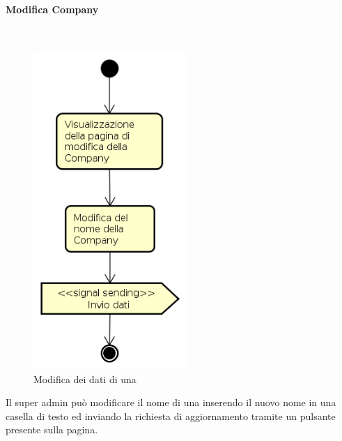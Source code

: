 \paragraph{Modifica Company} \mbox{} \\
\begin{figure}[H]
\begin{center}
\includegraphics[height=12cm]{res/sections/backend/activities/modificaCompanySA.png}
\caption{Modifica dei dati di una }
\end{center}
\end{figure}
Il super admin può modificare il nome di una  inserendo il nuovo nome in una casella di testo ed inviando la richiesta di aggiornamento tramite un pulsante presente sulla pagina.
\newpage
